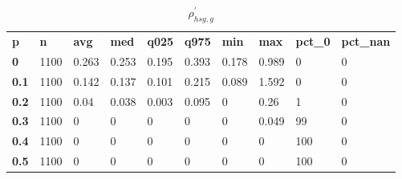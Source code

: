 \begin{table}[h]
 \centering 
\footnotesize
\caption{$\rho_{hsg,g}^\prime $}
\label{tab:alphahsgg}
\begin{tabular}[h]{| l l l l l l l l l l|
    } \hline
\textbf{ p} & \textbf{ n} & \textbf{ avg} & \textbf{ med} & \textbf{ q025} & \textbf{ q975} & \textbf{ min} & \textbf{ max} & \textbf{ pct\_0} & \textbf{ pct\_nan}
           \\
  \textbf{  0} & 1100 & 0.263 & 0.253 & 0.195 & 0.393 & 0.178 & 0.989 &   0 & 0
           \\
  \textbf{0.1} & 1100 & 0.142 & 0.137 & 0.101 & 0.215 & 0.089 & 1.592 &   0 & 0
           \\
  \textbf{0.2} & 1100 &  0.04 & 0.038 & 0.003 & 0.095 &     0 &  0.26 &   1 & 0
           \\
  \textbf{0.3} & 1100 &     0 &     0 &     0 &     0 &     0 & 0.049 &  99 & 0
           \\
  \textbf{0.4} & 1100 &     0 &     0 &     0 &     0 &     0 &     0 & 100 & 0
           \\
  \textbf{0.5} & 1100 &     0 &     0 &     0 &     0 &     0 &     0 & 100 & 0
           \\
 \hline \end{tabular}
 \end{table}
